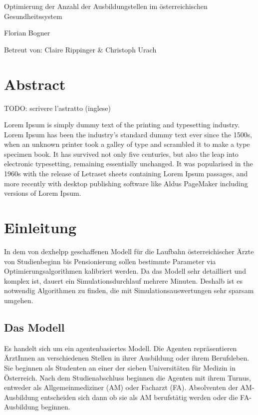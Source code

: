 \documentclass[a4paper,12pt]{article}
\begin{document}
\begin{titlepage}
\huge
\centering
Optimierung der Anzahl der Ausbildungstellen im österreichischen Gesundheitssystem 

\vfill

\normalsize
Florian Bogner

Betreut von: Claire Rippinger \& Christoph Urach
\end{titlepage}




\tableofcontents
\newpage

\section{Abstract}

TODO: scrivere l'astratto (inglese)

Lorem Ipsum is simply dummy text of the printing and typesetting industry. Lorem Ipsum has been the industry's standard dummy text ever since the 1500s, when an unknown printer took a galley of type and scrambled it to make a type specimen book. It has survived not only five centuries, but also the leap into electronic typesetting, remaining essentially unchanged. It was popularised in the 1960s with the release of Letraset sheets containing Lorem Ipsum passages, and more recently with desktop publishing software like Aldus PageMaker including versions of Lorem Ipsum.

\section{Einleitung}

In dem von dexhelpp geschaffenen Modell für die Laufbahn österreichischer Ärzte von Studienbeginn bis Pensionierung sollen bestimmte Parameter via Optimierungsalgorithmen kalibriert werden. Da das Modell sehr detailliert und komplex ist, dauert ein Simulationsdurchlauf mehrere Minuten. Deshalb ist es notwendig Algorithmen zu finden, die mit Simulationsauswertungen sehr sparsam umgehen. 

\subsection{Das Modell}

Es handelt sich um ein agentenbasiertes Modell. Die Agenten repräsentieren ÄrztInnen an verschiedenen Stellen in ihrer Ausbildung oder ihrem Berufsleben. Sie beginnen als Studenten an einer der sieben Universitäten für Medizin in Österreich. Nach dem Studienabschluss beginnen die Agenten mit ihrem Turnus, entweder als Allgemeinmediziner (AM) oder Facharzt (FA). Absolventen der AM-Ausbildung entscheiden sich dann ob sie als AM berufstätig werden oder die FA-Ausbildung beginnen. 
\end{document}
